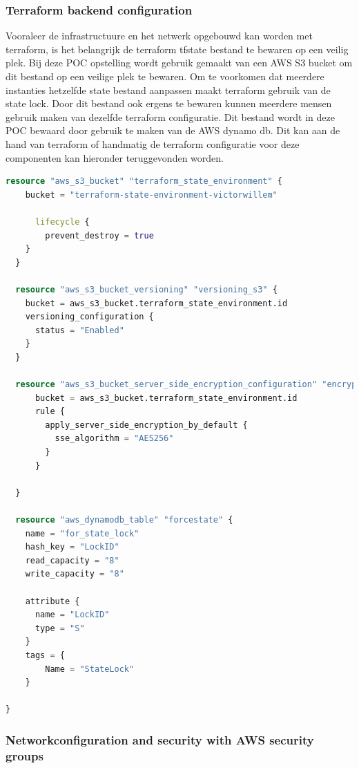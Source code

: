 \subsubsection{
{Terraform backend configuration}}
\label{sec:Terraform backend configuratie}

Vooraleer de infrastructuure en het netwerk opgebouwd kan worden met terraform, is het belangrijk de terraform tfstate bestand te bewaren op een veilig plek. Bij deze POC opstelling wordt gebruik gemaakt van een AWS S3 bucket om dit bestand op een veilige plek te bewaren. Om te voorkomen dat meerdere instanties hetzelfde state bestand aanpassen maakt terraform gebruik van de state lock. Door dit bestand ook ergens te bewaren kunnen meerdere mensen gebruik maken van dezelfde terraform configuratie. Dit bestand wordt in deze POC bewaard door gebruik te maken van de AWS dynamo db. Dit kan aan de hand van terraform of handmatig de terraform configuratie voor deze componenten kan hieronder teruggevonden worden.
\newline

\begin{lstlisting}[language=terraform]
  resource "aws_s3_bucket" "terraform_state_environment" { 
    bucket = "terraform-state-environment-victorwillem" 
      
      lifecycle { 
        prevent_destroy = true 
    } 
  }

  resource "aws_s3_bucket_versioning" "versioning_s3" {
    bucket = aws_s3_bucket.terraform_state_environment.id
    versioning_configuration {
      status = "Enabled"
    }
  }
  
  resource "aws_s3_bucket_server_side_encryption_configuration" "encryption_s3" {
      bucket = aws_s3_bucket.terraform_state_environment.id
      rule {
        apply_server_side_encryption_by_default {
          sse_algorithm = "AES256"
        }
      }
    
  }

  resource "aws_dynamodb_table" "forcestate" {
    name = "for_state_lock"
    hash_key = "LockID"
    read_capacity = "8"
    write_capacity = "8"

    attribute {
      name = "LockID"
      type = "S"
    }
    tags = {
        Name = "StateLock"
    }
  
}
\end{lstlisting}

\subsubsection{
{Networkconfiguration and security with AWS security groups}}
\label{sec:Netwerkconfiguratie en beveiliging met AWS security groups}

